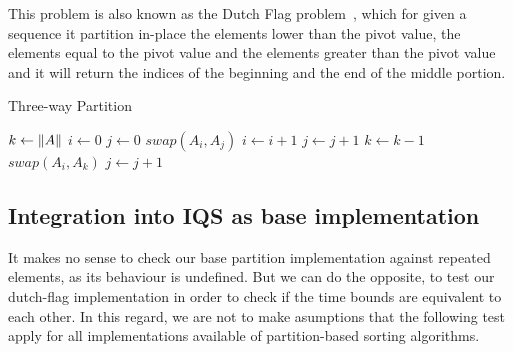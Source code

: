 This problem is also known as the Dutch Flag problem~\cite{10.5555/550359}, which for given a sequence it partition in-place the elements lower than the pivot value, the elements equal to the pivot value and the elements greater than the pivot value and it will return the indices of the beginning and the end of the middle portion.

\begin{algorithm}
\caption{Three-way Partition}\label{ALG:DUTCH_FLAG_PARTITION}
\begin{algorithmic}[1]
    \State $k \gets \lVert A\rVert$
    \State $i \gets 0$
    \State $j \gets 0$
            \State $swap(A_i, A_j)$
            \State $i \gets i+1$
            \State $j \gets j+1$
            \State $k \gets k-1$
            \State $swap(A_i, A_k)$
        \Else
            \State $j \gets j+1$
        \EndIf
    \EndWhile
    \EndProcedure
\end{algorithmic}
\end{algorithm}

\subsection{Integration into IQS as base implementation}

It makes no sense to check our base partition implementation against repeated elements, as its behaviour is undefined. But we can do the opposite, to test our dutch-flag implementation in order to check if the time bounds are equivalent to each other. In this regard, we are not to make asumptions that the following test apply for all implementations available of partition-based sorting algorithms.

